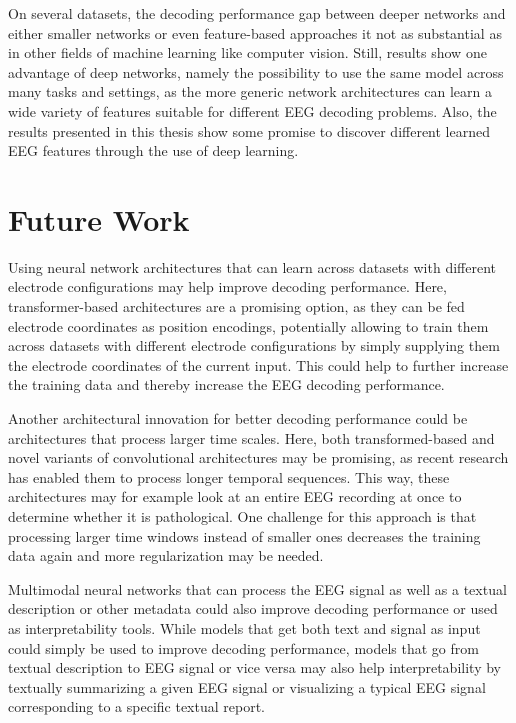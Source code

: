 On several datasets, the decoding performance gap between deeper
networks and either smaller networks or even feature-based approaches it
not as substantial as in other fields of machine learning like computer
vision. Still, results show one advantage of deep networks, namely the
possibility to use the same model across many tasks and settings, as the
more generic network architectures can learn a wide variety of features
suitable for different EEG decoding problems. Also, the results
presented in this thesis show some promise to discover different learned
EEG features through the use of deep learning.


\section{Future Work}\label{future-work}

Using neural network architectures that can learn across datasets with
different electrode configurations may help improve decoding
performance. Here, transformer-based architectures
\citep{DBLP:conf/nips/VaswaniSPUJGKP17} are a promising
option, as they can be fed electrode coordinates as position encodings,
potentially allowing to train them across datasets with different
electrode configurations by simply supplying them the electrode
coordinates of the current input. This could help to further increase
the training data and thereby increase the EEG decoding performance.

Another architectural innovation for better decoding performance could
be architectures that process larger time scales. Here, both
transformed-based
\citep{bigbird,etc,DBLP:journals/corr/abs-2004-05150,longt5,DBLP:journals/tacl/RoySVG21,block_recurrent_transformers,DBLP:conf/nips/DaoFERR22}
and novel variants of convolutional architectures
\citep{DBLP:journals/corr/abs-2302-06646,DBLP:journals/corr/abs-2302-10866}
may be promising, as recent research has enabled them to process longer
temporal sequences. This way, these architectures may for example look
at an entire EEG recording at once to determine whether it is
pathological. One challenge for this approach is that processing larger
time windows instead of smaller ones decreases the training data again
and more regularization may be needed.

Multimodal neural networks that can process the EEG signal as well as a
textual description or other metadata could also improve decoding
performance or used as interpretability tools. While models that get
both text and signal as input could simply be used to improve decoding
performance, models that go from textual description to EEG signal or
vice versa \cite{pmlr-v106-biswal19a,de2022learning} may also
help interpretability by textually summarizing a given EEG signal or
visualizing a typical EEG signal corresponding to a specific textual
report.

